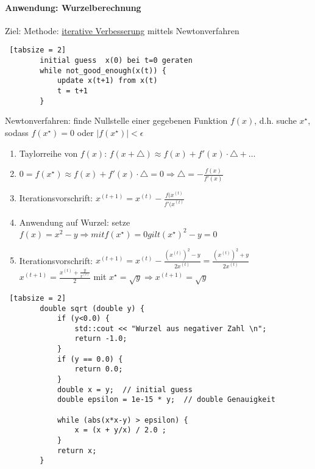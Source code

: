 \documentclass{article}
\begin{document}
	\paragraph{Anwendung: Wurzelberechnung}
	
	Ziel: 
	Methode: \underline{iterative Verbesserung} mittels Newtonverfahren
	\begin{lstlisting} [tabsize = 2]
		initial guess  x(0) bei t=0 geraten
		while not_good_enough(x(t)) {
			update x(t+1) from x(t)
			t = t+1
		}
	\end{lstlisting}
	
	Newtonverfahren: finde Nullstelle einer gegebenen Funktion $f(x)$, d.h. suche $x^\star$, sodass $f(x^\star)=0$ oder $|f(x^\star)| < \epsilon$
	
	\begin{enumerate}
		\item Taylorreihe von $f(x)$: $f(x+\triangle) \approx f(x) + f'(x) \cdot \triangle + \dots$
		\item $0 = f(x^\star) \approx f(x) + f'(x) \cdot \triangle = 0 \Rightarrow \triangle = -\frac{f(x)}{f'(x)}$
		\item Iterationsvorschrift: $x^{(t+1)} = x^{(t)} - \frac{f(x^{(t)}}{f'(x^{(t)}}$
		\item Anwendung auf Wurzel: setze $f(x) = x^2 -y \Rightarrow mit f(x^\star) =0 gilt (x^\star)^2 -y=0$
		\item Iterationsvorschrift: $x^{(t+1)} = x^{(t)} - \frac{(x^{(t)})^2 -y}{2 x^{(t)}} = \frac{(x^{(t)})^2 + y}{2 x^{(t)}}$ \\
		$ x^{(t+1)} = \frac{x^{(t)} + \frac{y}{x^{(t)}}}{2}$ mit $ x^\star = \sqrt{y} \Rightarrow x^{(t+1)} = \sqrt{y}$
	\end{enumerate}
	
	\begin{lstlisting} [tabsize = 2]
		double sqrt (double y) {
			if (y<0.0) {
				std::cout << "Wurzel aus negativer Zahl \n";
				return -1.0;
			}
			if (y == 0.0) {
				return 0.0;
			}
			double x = y;  // initial guess
			double epsilon = 1e-15 * y;  // double Genauigkeit
			
			while (abs(x*x-y) > epsilon) {
				x = (x + y/x) / 2.0 ;
			}
			return x;
		}
	\end{lstlisting}
	
\end{document}
